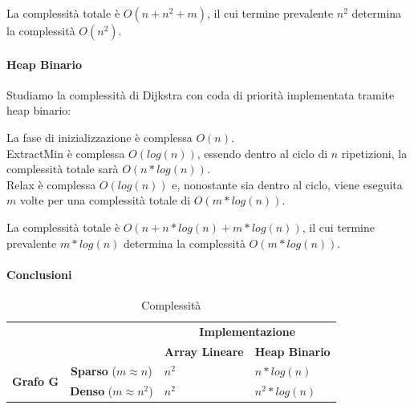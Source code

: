 \documentclass[tikz]{article}
\let\oldparagraph\paragraph
\renewcommand{\paragraph}[1]{\oldparagraph{#1}\mbox{}}
\begin{document}
{{La complessità totale è $O(n+n^2+m)$, il cui termine prevalente $n^2$ determina la complessità $O(n^2)$.

\paragraph{Heap Binario}

{Studiamo la complessità di Dijkstra con coda di priorità implementata tramite heap binario:}

La fase di inizializzazione è complessa $O(n)$. \\
ExtractMin è complessa $O(log(n))$, essendo dentro al ciclo di $n$ ripetizioni, la complessità totale sarà $O(n*log(n))$. \\
Relax è complessa $O(log(n))$ e, nonostante sia dentro al ciclo, viene eseguita $m$ volte per una complessità totale di $O(m*log(n))$.

La complessità totale è $O(n+n*log(n)+m*log(n))$, il cui termine prevalente $m*log(n)$ determina la complessità $O(m*log(n))$.

\paragraph{Conclusioni}

\begin{table}[h]
\centering
\caption{Complessità}
\begin{tabular}{ll|l|l|}
\cline{3-4}
                                                        &                                      & \multicolumn{2}{c|}{\textbf{Implementazione}}                                            \\ \cline{3-4} 
                                                        &                                      & \multicolumn{1}{c|}{\textbf{Array Lineare}} & \multicolumn{1}{c|}{\textbf{Heap Binario}} \\ \hline
\multicolumn{1}{|c|}{\multirow{2}{*}{\textbf{Grafo G}}} & \multicolumn{1}{c|}{\textbf{Sparso} ($m \approx n$)} & $n^2$                                         & $n*log(n)$                                        \\ \cline{2-4} 
\multicolumn{1}{|c|}{}                                  & \multicolumn{1}{c|}{\textbf{Denso}  ($m \approx n^2$)}  & $n^2$                                         & $n^2*log(n)$                                                                               \\ \hline
\end{tabular}
\end{table}

}}
\end{document}
